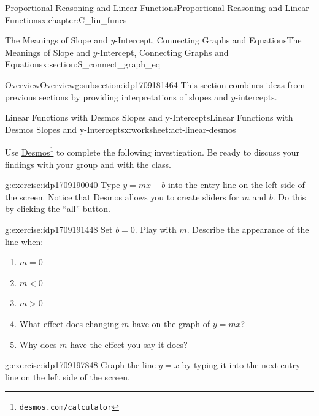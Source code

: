 \documentclass[oneside,10pt,]{book}
\numberwithin{equation}{chapter}
\newcommand{\lt}{<}
\newcommand{\gt}{>}
\begin{document}
\begin{chapterptx}{Proportional Reasoning and Linear Functions}{}{Proportional Reasoning and Linear Functions}{}{}{x:chapter:C_lin_funcs}
\begin{sectionptx}{The Meanings of Slope and \(y\)-Intercept, Connecting Graphs and Equations}{}{The Meanings of Slope and \(y\)-Intercept, Connecting Graphs and Equations}{}{}{x:section:S_connect_graph_eq}
\typeout{************************************************}
%
\begin{subsectionptx}{Overview}{}{Overview}{}{}{g:subsection:idp1709181464}
This section combines ideas from previous sections by providing interpretations of slopes and \(y\)-intercepts.%
\end{subsectionptx}
%
%
\typeout{************************************************}
\typeout{************************************************}
%
\begin{worksheet-subsection}{Linear Functions with Desmos \textemdash{} Slopes and y-Intercepts}{}{Linear Functions with Desmos \textemdash{} Slopes and y-Intercepts}{}{}{x:worksheet:act-linear-desmos}
\begin{introduction}{}%
Use \href{https://www.desmos.com/calculator}{Desmos}\footnote{\nolinkurl{desmos.com/calculator}\label{g:fn:idp1709189912}} to complete the following investigation. Be ready to discuss your findings with your group and with the class.%
\end{introduction}%
\begin{divisionexercise}{1}{}{}{g:exercise:idp1709190040}%
Type \(y = mx + b\) into the entry line on the left side of the screen. Notice that Desmos allows you to create sliders for \(m\) and \(b\). Do this by clicking the ``all'' button.%
\end{divisionexercise}%
\begin{divisionexercise}{2}{}{}{g:exercise:idp1709191448}%
Set \(b = 0\). Play with \(m\). Describe the appearance of the line when:%
\begin{enumerate}[font=\bfseries,label=(\alph*),ref=\alph*]
\item{}\(m = 0\)%
\item{}\(m \lt 0\)%
\item{}\(m \gt 0\)%
\item{}What effect does changing \(m\) have on the graph of \(y = mx\)?%
\item{}Why does \(m\) have the effect you say it does?%
\end{enumerate}
\end{divisionexercise}%
\begin{divisionexercise}{3}{}{}{g:exercise:idp1709197848}%
Graph the line \(y = x\) by typing it into the next entry line on the left side of the screen.%
\end{divisionexercise}%

\end{worksheet-subsection}
\end{sectionptx}
\end{chapterptx}
\end{document}
